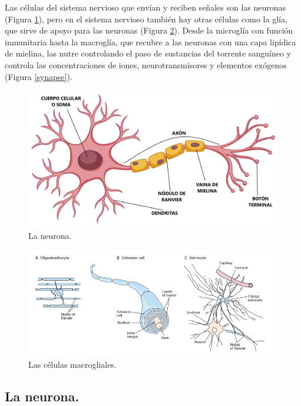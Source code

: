 Las células del sistema nervioso que envían y reciben señales son las neuronas (Figura \ref{neuron}), pero en el sistema nervioso también hay otras células como la glía, que sirve de apoyo para las neuronas (Figura \ref{glia}). Desde la microglía con función inmunitaria hasta la macroglía, que recubre a las neuronas con una capa lipídica de mielina, las nutre controlando el paso de sustancias del torrente sanguíneo y controla las concentraciones de iones, neurotransmisores y elementos exógenos (Figura \ref{synapse}).

\begin{figure}[H]
	\centering

	\includegraphics[width=\linewidth]{media/5-neuron.jpg}
	\caption{La neurona.}
	\label{neuron}
\end{figure}

\begin{figure}[H]
	\centering

	\includegraphics[width=\linewidth]{media/5-glia.png}
	\caption{Las células macrogliales.}
	\label{glia}
\end{figure}

\subsection{La neurona.}

